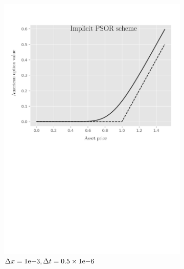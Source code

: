 \begin{figure}[H]
\begin{subfigure}{0.4\textwidth}
    \includegraphics[width=\textwidth]{chapters/chapter5/TestCase1ImplicitLCP.pdf}
    \caption{$\Delta{x}={1}\mathrm{e}{-3}, \Delta{t}=0.5\times{1}\mathrm{e}{-6}$}
    \label{fig:lcp:numericaresults:test_case_1_implicit}
  \end{subfigure}
  \hspace{0.5cm}
  \begin{subfigure}{0.4\textwidth}
    \label{fig:lcp:numericaresults:test_case_1_crank_nicholson}
    \centering

\end{subfigure}
\end{figure}
